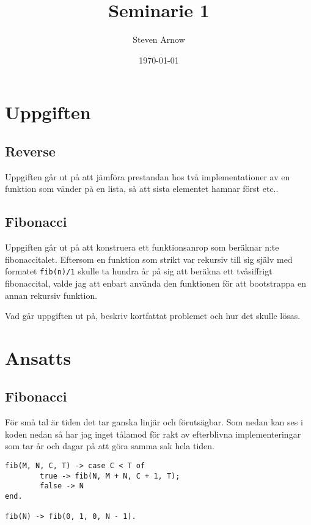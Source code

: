 \documentclass[a4paper, 11pt]{article}
\title{Seminarie 1}
\author{Steven Arnow}
\date{\today}
\begin{document}
\maketitle 

\section{Uppgiften}

\subsection{Reverse}

Uppgiften går ut på att jämföra prestandan hos två implementationer av en funktion som vänder på en lista, så att sista elementet hamnar först etc..

\subsection{Fibonacci}
Uppgiften går ut på att konstruera ett funktionsanrop som beräknar n:te fibonaccitalet. Eftersom en funktion som strikt var rekursiv till sig själv med formatet \texttt{fib(n)/1} skulle ta hundra år på sig att beräkna ett tvåsiffrigt fibonaccital, valde jag att enbart använda den funktionen för att bootstrappa en annan rekursiv funktion.

Vad går uppgiften ut på, beskriv kortfattat problemet och hur det skulle lösas.






\section{Ansatts}

\subsection{Fibonacci}

För små tal är tiden det tar ganska linjär och förutsägbar. Som nedan kan ses i koden nedan så har jag inget tålamod för rakt av efterblivna implementeringar som tar år och dagar på att göra samma sak hela tiden.

\begin{verbatim}
fib(M, N, C, T) -> case C < T of
        true -> fib(N, M + N, C + 1, T);
        false -> N
end.

fib(N) -> fib(0, 1, 0, N - 1).
\end{verbatim}
\end{document}

